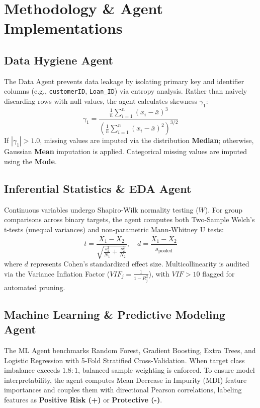 \documentclass[10pt,journal,compsoc]{IEEEtran}
\begin{document}
\section{Methodology \& Agent Implementations}

\subsection{Data Hygiene Agent}
The Data Agent prevents data leakage by isolating primary key and identifier columns (e.g., \texttt{customerID}, \texttt{Loan\_ID}) via entropy analysis. Rather than naively discarding rows with null values, the agent calculates skewness $\gamma_1$:
\begin{equation}
\gamma_1 = \frac{\frac{1}{n}\sum_{i=1}^n (x_i - \bar{x})^3}{\left(\frac{1}{n}\sum_{i=1}^n (x_i - \bar{x})^2\right)^{3/2}}
\end{equation}
If $|\gamma_1| > 1.0$, missing values are imputed via the distribution \textbf{Median}; otherwise, Gaussian \textbf{Mean} imputation is applied. Categorical missing values are imputed using the \textbf{Mode}.

\subsection{Inferential Statistics \& EDA Agent}
Continuous variables undergo Shapiro-Wilk normality testing ($W$). For group comparisons across binary targets, the agent computes both Two-Sample Welch's t-tests (unequal variances) and non-parametric Mann-Whitney U tests:
\begin{equation}
t = \frac{\bar{X}_1 - \bar{X}_2}{\sqrt{\frac{s_1^2}{N_1} + \frac{s_2^2}{N_2}}}, \quad d = \frac{\bar{X}_1 - \bar{X}_2}{s_{\text{pooled}}}
\end{equation}
where $d$ represents Cohen's standardized effect size. Multicollinearity is audited via the Variance Inflation Factor ($VIF_j = \frac{1}{1 - R_j^2}$), with $VIF > 10$ flagged for automated pruning.

\subsection{Machine Learning \& Predictive Modeling Agent}
The ML Agent benchmarks Random Forest, Gradient Boosting, Extra Trees, and Logistic Regression with 5-Fold Stratified Cross-Validation. When target class imbalance exceeds $1.8:1$, balanced sample weighting is enforced. To ensure model interpretability, the agent computes Mean Decrease in Impurity (MDI) feature importances and couples them with directional Pearson correlations, labeling features as \textbf{Positive Risk (+)} or \textbf{Protective (-)}.
\end{document}
